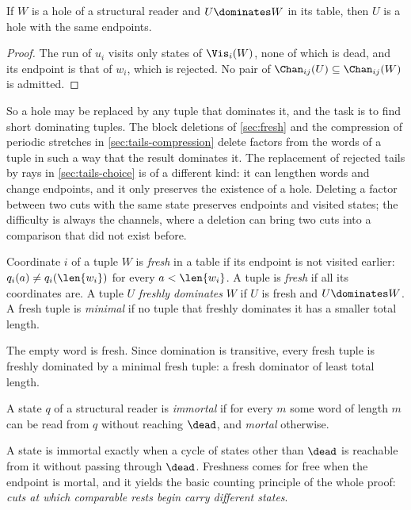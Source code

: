 \begin{lemma}\label{lem:hole-dominates}
If $W$ is a hole of a structural reader and $U\dominates W$ in its table,
then $U$ is a hole with the same endpoints.
\end{lemma}

\begin{proof}
The run of $u_i$ visits only states of $\Vis_i(W)$, none of which is dead,
and its endpoint is that of $w_i$, which is rejected. No pair of
$\Chan_{ij}(U)\subseteq\Chan_{ij}(W)$ is admitted.
\end{proof}

So a hole may be replaced by any tuple that dominates it, and the task is to
find short dominating tuples. The block deletions of \cref{sec:fresh} and
the compression of periodic stretches in \cref{sec:tails-compression} delete factors from the
words of a tuple in such a way that the result dominates it. The
replacement of rejected tails by rays in \cref{sec:tails-choice} is of a
different kind: it can lengthen words and change endpoints, and it only
preserves the existence of a hole. Deleting a factor between two cuts with the same state preserves endpoints
and visited states; the difficulty is always the channels, where a deletion
can bring two cuts into a comparison that did not exist before.

\begin{definition}\label{def:fresh}
Coordinate $i$ of a tuple $W$ is \emph{fresh} in a table if its endpoint is
not visited earlier: $q_i(a)\ne q_i(\len{w_i})$ for every $a<\len{w_i}$. A
tuple is \emph{fresh} if all its coordinates are. A tuple $U$ \emph{freshly
dominates} $W$ if $U$ is fresh and $U\dominates W$. A fresh tuple is
\emph{minimal} if no tuple that freshly dominates it has a smaller total
length.
\end{definition}

The empty word is fresh. Since domination is transitive, every fresh tuple is
freshly dominated by a minimal fresh tuple: a fresh dominator of least total
length.

\begin{definition}\label{def:immortal}
A state $q$ of a structural reader is \emph{immortal} if for every $m$ some
word of length $m$ can be read from $q$ without reaching $\dead$, and
\emph{mortal} otherwise.
\end{definition}

A state is immortal exactly when a cycle of states other than $\dead$ is
reachable from it without passing through $\dead$. Freshness comes for free
when the endpoint is mortal, and it yields the basic counting principle of
the whole proof: \emph{cuts at which comparable rests begin carry different
states}.

